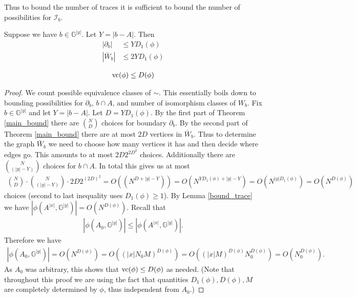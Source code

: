 \documentclass{amsart}
\newcommand{\II}{\mathscr I}
\newcommand{\GG}{\mathbb G}
\newcommand{\GGY}{\GG^{|y|}}
\newcommand{\AX}{A^{|x|}}
\newcommand{\paren}[1]{\left(#1\right)}
\newcommand{\abs}[1]{\left|#1\right|}
\begin{document}
Thus to bound the number of traces it is sufficient to bound the number of possibilities for $\II_b$.

\begin{Theorem} \label{main_bound}
  Suppose we have $b \in \GGY$.
  Let $Y = \abs{b - A}$.
  Then
  \begin{align*}
    |\partial_b| &\leq Y D_1(\phi) \\ 
    |\bar W_b| &\leq 2 Y D_1(\phi)
  \end{align*}
\end{Theorem}

\begin{Corollary}
  \begin{align*}
    \vc(\phi) \leq D(\phi) %
  \end{align*}
\end{Corollary}

\begin{proof}
  We count possible equivalence classes of $\sim$.
  This essentially boils down to bounding possibilities for $\partial_b$, $b \cap A$, and number of isomorphism classes of $W_b$.
  Fix $b \in \GGY$ and let $Y = \abs{b - A}$.
  Let $D = Y D_1(\phi)$.
  By the first part of Theorem \ref{main_bound} there are $N \choose D$ choices for boundary $\partial_b$.
  By the second part of Theorem \ref{main_bound} there are at most $2D$ vertices in $\bar W_b$.
  Thus to determine the graph $\bar W_b$ we need to choose how many vertices it has and then decide where edges go.
  This amounts to at most $2D 2^{{2D}^2}$ choices.
  Additionally there are $N \choose (|y| - Y)$ choices for $b \cap A$.
  In total this gives us at most
  \begin{align*}
    {N \choose D} \cdot {N \choose (|y| - Y)} \cdot 2D 2^{(2D)^2} = O((N^{D + |y| - Y})) = O(N^{Y D_1(\phi) + |y| - Y}) = O(N^{|y| D_1(\phi)}) = O(N^{D(\phi)})
  \end{align*}
  choices (second to last inequality uses $D_1(\phi) \geq 1$).
  By Lemma \ref{bound_trace} we have $\abs{\phi(\AX, \GGY)} = O(N^{D(\phi)})$.
  Recall that 
  \begin{align*}
    \abs{\phi(A_0, \GGY)} \leq \abs{\phi(\AX, \GGY)}.    
  \end{align*}
  Therefore we have
  \begin{align*}
    \abs{\phi(A_0, \GGY)} = O(N^{D(\phi)}) = O(\paren{|x| N_0 M}^{D(\phi)}) = O(\paren{|x| M}^{D(\phi)} N_0^{D(\phi)}) = O(N_0^{D(\phi)}).
  \end{align*}
  As $A_0$ was arbitrary, this shows that $\operatorname{vc}(\phi) \leq D(\phi)$ as needed.
  (Note that throughout this proof we are using the fact that quantities $D_1(\phi), D(\phi), M$ are completely determined by $\phi$,
  thus independent from $A_0$.)
\end{proof}
\end{document}
